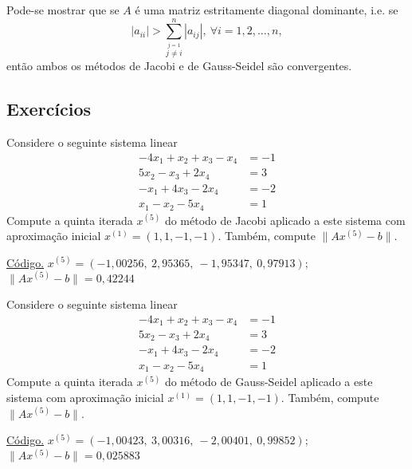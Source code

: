 \begin{obs}{}
  Pode-se mostrar que se $A$ é uma matriz estritamente diagonal dominante, i.e. se
  \begin{equation}
    |a_{ii}| > \sum_{\overset{j=1}{j\neq i}}^n |a_{ij}|,~\forall i=1, 2, \ldots, n,
  \end{equation}
então ambos os métodos de Jacobi e de Gauss-Seidel são convergentes.
\end{obs}

\subsection*{Exercícios}

\begin{exer}\label{exer:jacobi_exec}
  Considere o seguinte sistema linear
  \begin{align}
    -4x_1 + x_2 + x_3 - x_4 &= -1\\
    5x_2 -x_3 + 2x_4 &= 3\\
    -x_1 + 4x_3 - 2x_4 &= -2\\
    x_1 -x_2 -5x_4 &= 1
  \end{align}
  Compute a quinta iterada $x^{(5)}$ do método de Jacobi aplicado a este sistema com aproximação inicial $x^{(1)} = (1, 1, -1, -1)$. Também, compute $\|Ax^{(5)} - b\|$.
\end{exer}
\begin{resp}
    \ifisoctave 
    \href{https://github.com/phkonzen/notas/blob/master/src/MatematicaNumerica/cap_sl_iter/dados/exer_jacobi_exec/exer_jacobi_exec.m}{Código.} 
  \fi
  $x^{(5)} = (-1,00256,~2,95365,~-1,95347,~0,97913)$; $\|Ax^{(5)}-b\| = 0,42244$
\end{resp}

\begin{exer}\label{exer:gs_exec}
  Considere o seguinte sistema linear
  \begin{align}
    -4x_1 + x_2 + x_3 - x_4 &= -1\\
    5x_2 -x_3 + 2x_4 &= 3\\
    -x_1 + 4x_3 - 2x_4 &= -2\\
    x_1 -x_2 -5x_4 &= 1
  \end{align}
  Compute a quinta iterada $x^{(5)}$ do método de Gauss-Seidel aplicado a este sistema com aproximação inicial $x^{(1)} = (1, 1, -1, -1)$. Também, compute $\|Ax^{(5)} - b\|$.
\end{exer}
\begin{resp}
    \ifisoctave 
    \href{https://github.com/phkonzen/notas/blob/master/src/MatematicaNumerica/cap_sl_iter/dados/exer_gs_exec/exer_gs_exec.m}{Código.} 
  \fi
  $x^{(5)} = (-1,00423,~3,00316,~-2,00401,~0,99852)$; $\|Ax^{(5)}-b\| = 0,025883$
\end{resp}

